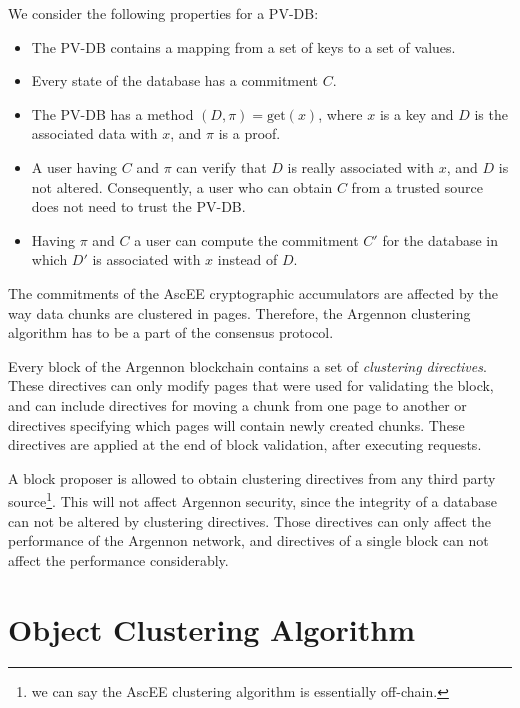 We consider the following properties for a PV-DB:
\begin{itemize}
    \item The PV-DB contains a mapping from a set of keys to a set of values.
    \item Every state of the database has a commitment \(C\).
    \item The PV-DB has a method \((D, \pi) = \text{get}(x)\), where \(x\) is a key and \(D\) is the associated data
    with \(x\), and \(\pi\) is a proof.
    \item A user having \(C\) and \(\pi\) can verify that \(D\) is really associated with \(x\), and \(D\) is not
    altered. Consequently, a user who can obtain \(C\) from a trusted source does not need to trust the PV-DB\@.
    \item Having \(\pi\) and \(C\) a user can compute the commitment \(C'\) for the database in which \(D'\) is
    associated with \(x\) instead of \(D\).
\end{itemize}

The commitments of the AscEE cryptographic accumulators are affected by the way data chunks are clustered in pages.
Therefore, the Argennon clustering algorithm has to be a part of the consensus protocol.

Every block of the Argennon blockchain contains a set of \emph{clustering directives}. These directives
can only modify pages that were used for validating the block, and can
include directives for moving a chunk from one page to another or directives specifying which pages will contain
newly created chunks. These directives are applied at the end of block validation, after executing requests.

A block proposer is allowed to obtain clustering directives from any third party source\footnote{we can say the AscEE
clustering algorithm is essentially off-chain.}. This will not
affect Argennon security, since the integrity of a database can not be altered by clustering directives.
Those directives can only affect the performance of the Argennon network, and directives of a single block can
not affect the performance considerably.

\section{Object Clustering Algorithm}\label{sec:clustering}



